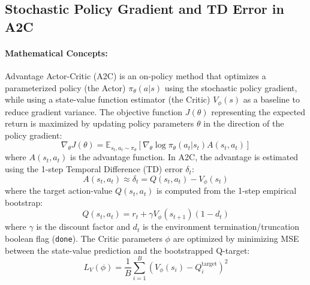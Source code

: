 \documentclass[10pt,twocolumn,letterpaper]{article}
\begin{document}
\subsection{Stochastic Policy Gradient and TD Error in A2C}
\label{subsec:impl_a2c}

\paragraph{Mathematical Concepts:}
Advantage Actor-Critic (A2C) is an on-policy method that optimizes a
parameterized policy (the Actor) $\pi_\theta(a|s)$ using the stochastic
policy gradient, while using a state-value function estimator (the Critic)
$V_\phi(s)$ as a baseline to reduce gradient variance. The objective
function $J(\theta)$ representing the expected return is maximized by
updating policy parameters $\theta$ in the direction of the policy
gradient:
\begin{equation}
  \nabla_\theta J(\theta) = \mathbb{E}_{s_t, a_t \sim \pi_\theta} \left[ \nabla_\theta \log \pi_\theta(a_t | s_t) A(s_t, a_t) \right]
  \label{eq:pg}
\end{equation}
where $A(s_t, a_t)$ is the advantage function. In A2C, the advantage is
estimated using the 1-step Temporal Difference (TD) error $\delta_t$:
\begin{equation}
  A(s_t, a_t) \approx \delta_t = Q(s_t, a_t) - V_\phi(s_t)
  \label{eq:advantage}
\end{equation}
where the target action-value $Q(s_t, a_t)$ is computed from the 1-step
empirical bootstrap:
\begin{equation}
  Q(s_t, a_t) = r_t + \gamma V_\phi(s_{t+1}) (1 - d_t)
  \label{eq:q_val}
\end{equation}
where $\gamma$ is the discount factor and $d_t$ is the environment
termination/truncation boolean flag (\texttt{done}). The Critic
parameters $\phi$ are optimized by minimizing MSE between the
state-value prediction and the bootstrapped Q-target:
\begin{equation}
  L_V(\phi) = \frac{1}{B} \sum_{i=1}^B \left( V_\phi(s_i) - Q^{\text{target}}_i \right)^2
  \label{eq:critic_loss}
\end{equation}
\end{document}
